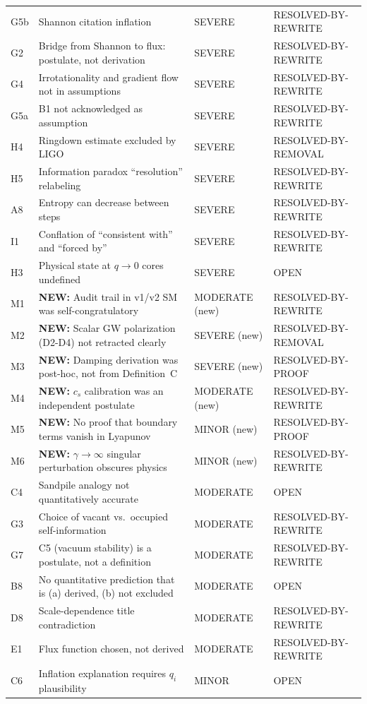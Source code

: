 \documentclass[reprint]{revtex4-2}
\begin{document}
\begin{table}[h]
\begin{tabular}{p{0.5cm}p{5.5cm}ll}
G5b & Shannon citation inflation & SEVERE & RESOLVED-BY-REWRITE \\
G2 & Bridge from Shannon to flux: postulate, not derivation & SEVERE & RESOLVED-BY-REWRITE \\
G4 & Irrotationality and gradient flow not in assumptions & SEVERE & RESOLVED-BY-REWRITE \\
G5a & B1 not acknowledged as assumption & SEVERE & RESOLVED-BY-REWRITE \\
H4 & Ringdown estimate excluded by LIGO & SEVERE & RESOLVED-BY-REMOVAL \\
H5 & Information paradox ``resolution'' relabeling & SEVERE & RESOLVED-BY-REWRITE \\
A8 & Entropy can decrease between steps & SEVERE & RESOLVED-BY-REWRITE \\
I1 & Conflation of ``consistent with'' and ``forced by'' & SEVERE & RESOLVED-BY-REWRITE \\
H3 & Physical state at $q\to 0$ cores undefined & SEVERE & OPEN \\
M1 & \textbf{NEW:} Audit trail in v1/v2 SM was self-congratulatory & MODERATE (new) & RESOLVED-BY-REWRITE \\
M2 & \textbf{NEW:} Scalar GW polarization (D2-D4) not retracted clearly & SEVERE (new) & RESOLVED-BY-REMOVAL \\
M3 & \textbf{NEW:} Damping derivation was post-hoc, not from Definition~C & SEVERE (new) & RESOLVED-BY-PROOF \\
M4 & \textbf{NEW:} $c_s$ calibration was an independent postulate & MODERATE (new) & RESOLVED-BY-REWRITE \\
M5 & \textbf{NEW:} No proof that boundary terms vanish in Lyapunov & MINOR (new) & RESOLVED-BY-PROOF \\
M6 & \textbf{NEW:} $\gamma\to\infty$ singular perturbation obscures physics & MINOR (new) & RESOLVED-BY-REWRITE \\
C4 & Sandpile analogy not quantitatively accurate & MODERATE & OPEN \\
G3 & Choice of vacant vs.\ occupied self-information & MODERATE & RESOLVED-BY-REWRITE \\
G7 & C5 (vacuum stability) is a postulate, not a definition & MODERATE & RESOLVED-BY-REWRITE \\
B8 & No quantitative prediction that is (a) derived, (b) not excluded & MODERATE & OPEN \\
D8 & Scale-dependence title contradiction & MODERATE & RESOLVED-BY-REWRITE \\
E1 & Flux function chosen, not derived & MODERATE & RESOLVED-BY-REWRITE \\
C6 & Inflation explanation requires $q_i$ plausibility & MINOR & OPEN \\
\bottomrule
\end{tabular}
\end{table}
\end{document}
